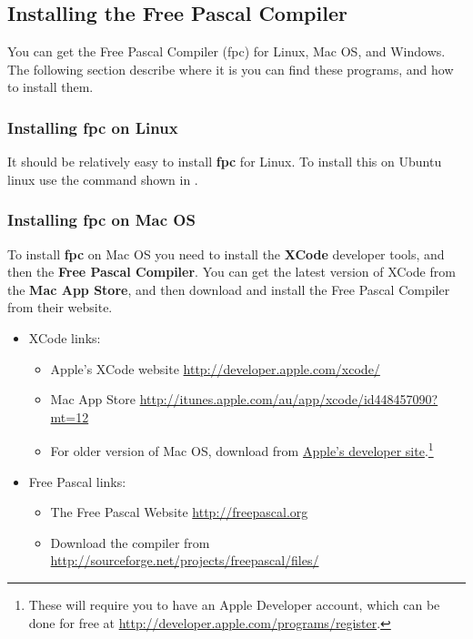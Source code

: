 \subsection{Installing the Free Pascal Compiler} %
\label{sub:installing_fpc}

You can get the Free Pascal Compiler (fpc) for Linux, Mac OS, and Windows. The following section describe where it is you can find these programs, and how to install them.

\subsubsection{Installing fpc on Linux} %
\label{ssub:fpc_linux}

It should be relatively easy to install \textbf{fpc} for Linux. To install this on Ubuntu linux use the command shown in .



\subsubsection{Installing fpc on Mac OS} %
\label{ssub:installing_fpc_on_mac_os}

To install \textbf{fpc} on Mac OS you need to install the \textbf{XCode} developer tools, and then the \textbf{Free Pascal Compiler}. You can get the latest version of XCode from the \textbf{Mac App Store}, and then download and install the Free Pascal Compiler from their website.

\begin{itemize}
  \item XCode links:
  \begin{itemize}
    \item Apple's XCode website \url{http://developer.apple.com/xcode/}
    \item Mac App Store  \url{http://itunes.apple.com/au/app/xcode/id448457090?mt=12}
    \item For older version of Mac OS, download from \href{https://developer.apple.com/downloads/download.action?path=Developer_Tools/xcode_3.2.2_developer_tools_beta_20728/xcode322_2148_developerdvd.dmg}{Apple's developer site}.\footnote{These will require you to have an Apple Developer account, which can be done for free at \url{http://developer.apple.com/programs/register}.}
  \end{itemize}
  \item Free Pascal links:
  \begin{itemize}
    \item The Free Pascal Website \url{http://freepascal.org}
    \item Download the compiler from \url{http://sourceforge.net/projects/freepascal/files/} 
  \end{itemize}
\end{itemize}

